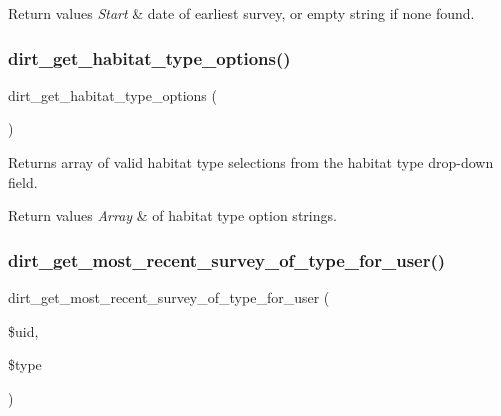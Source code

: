 \begin{DoxyRetVals}{Return values}
{\em Start} & date of earliest survey, or empty string if none found. \\
\hline
\end{DoxyRetVals}
\mbox{\label{dirt_8module_a4e704dbae445c08a671716dc59216977}} 
\subsubsection{\texorpdfstring{dirt\+\_\+get\+\_\+habitat\+\_\+type\+\_\+options()}{dirt\_get\_habitat\_type\_options()}}
{\footnotesize\ttfamily dirt\+\_\+get\+\_\+habitat\+\_\+type\+\_\+options (\begin{DoxyParamCaption}{ }\end{DoxyParamCaption})}

Returns array of valid habitat type selections from the habitat type drop-\/down field.


\begin{DoxyRetVals}{Return values}
{\em Array} & of habitat type option strings. \\
\hline
\end{DoxyRetVals}
\mbox{\label{dirt_8module_a1b0c1e790019392ca655dae67aee9642}} 
\subsubsection{\texorpdfstring{dirt\+\_\+get\+\_\+most\+\_\+recent\+\_\+survey\+\_\+of\+\_\+type\+\_\+for\+\_\+user()}{dirt\_get\_most\_recent\_survey\_of\_type\_for\_user()}}
{\footnotesize\ttfamily dirt\+\_\+get\+\_\+most\+\_\+recent\+\_\+survey\+\_\+of\+\_\+type\+\_\+for\+\_\+user (\begin{DoxyParamCaption}\item[{}]{\$uid,  }\item[{}]{\$type }\end{DoxyParamCaption})}

